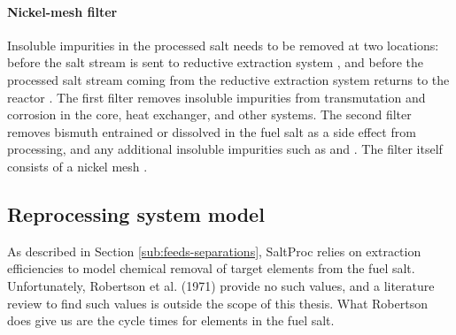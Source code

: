 \paragraph{Nickel-mesh filter}
Insoluble impurities in the processed salt needs to be removed at two locations:
before the salt stream is sent to reductive extraction system
\cite{lindauer_design_1969}, and before the processed salt stream coming
from the reductive extraction system returns to the
reactor \cite{robertson_conceptual_1971}. The first filter removes insoluble
impurities from transmutation and corrosion in the core, heat exchanger, and
other systems. The second filter removes  bismuth entrained or dissolved in the
fuel salt as a side effect from processing, and any additional insoluble
impurities such as  and . The filter itself consists of a
nickel mesh \cite{robertson_conceptual_1971}.


\subsection{Reprocessing system model}
As described in Section \ref{sub:feeds-separations}, SaltProc relies on extraction efficiencies to model chemical removal of target elements from the fuel salt.  Unfortunately, Robertson et al. (1971) 
\cite{robertson_conceptual_1971} provide no such values, and a literature review
to find such values is outside the scope of this thesis. What Robertson does
give us are the cycle times for elements in the fuel salt.

